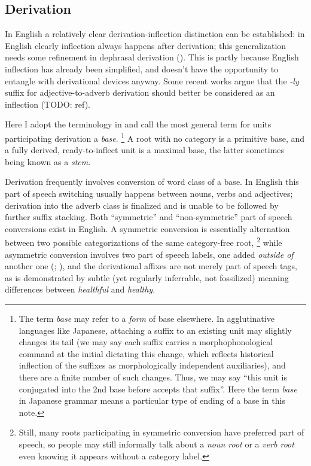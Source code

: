 \documentclass[UTF8, a4paper, oneside, scheme=plain, 12pt]{ctexbook}
\newcommand*{\citepage}[1]{p.~{#1}}
\newcommand*{\term}[1]{\emph{#1}}
\newcommand{\form}[1]{\emph{#1}}
\begin{document}
\subsection{Derivation}\label{sec:pos.overview.derivation.derivation}

In English a relatively clear derivation-inflection distinction can be established:
in English clearly inflection always happens after derivation;
this generalization needs some refinement in dephrasal derivation ().
This is partly because English inflection has already been simplified,
and doesn't have the opportunity to entangle with derivational devices anyway.
Some recent works argue that the \form{-ly} suffix for adjective-to-adverb derivation 
should better be considered as an inflection (TODO: ref).

Here I adopt the terminology in \citet{cgel}
and call the most general term for units participating derivation a \term{base}.%
\footnote{
    The term \term{base} may refer to a \emph{form} of base elsewhere.
    In agglutinative languages like Japanese,
    attaching a suffix to an existing unit may slightly changes its tail
    (we may say each suffix carries a morphophonological command at the initial
    dictating this change,
    which reflects historical inflection of the suffixes as 
    morphologically independent auxiliaries),
    and there are a finite number of such changes.
    Thus, we may say ``this unit is conjugated into the 2nd base before accepts that suffix''.
    Here the term \term{base} in Japanese grammar
    means a particular type of ending 
    of a base in this note.
}
A root with no category is a primitive base,
and a fully derived, ready-to-inflect unit is a maximal base,
the latter sometimes being known as a \term{stem}.


Derivation frequently involves conversion of word class of a base.
In English this part of speech switching usually happens between 
nouns, verbs and adjectives;
derivation into the adverb class is finalized 
and is unable to be followed by further suffix stacking.
Both ``symmetric'' and ``non-symmetric'' part of speech conversions exist in English.
A symmetric conversion is essentially 
alternation between two possible categorizations of the same category-free root,%
\footnote{
    Still, many roots participating in symmetric conversion 
    have preferred part of speech,
    so people may still informally talk about a \term{noun root} or a \term{verb root}
    even knowing it appears without a category label.
}
while asymmetric conversion involves two part of speech labels,
one added \emph{outside of} another one 
(\citealt[\citepage{1641}]{cgel}; \citealt[\citepage{62}, (15)]{siddiqi2009syntax}),
and the derivational affixes are not merely part of speech tags,
as is demonstrated by 
subtle (yet regularly inferrable, not fossilized) meaning differences between 
\form{healthful} and \form{healthy}.
\end{document}
